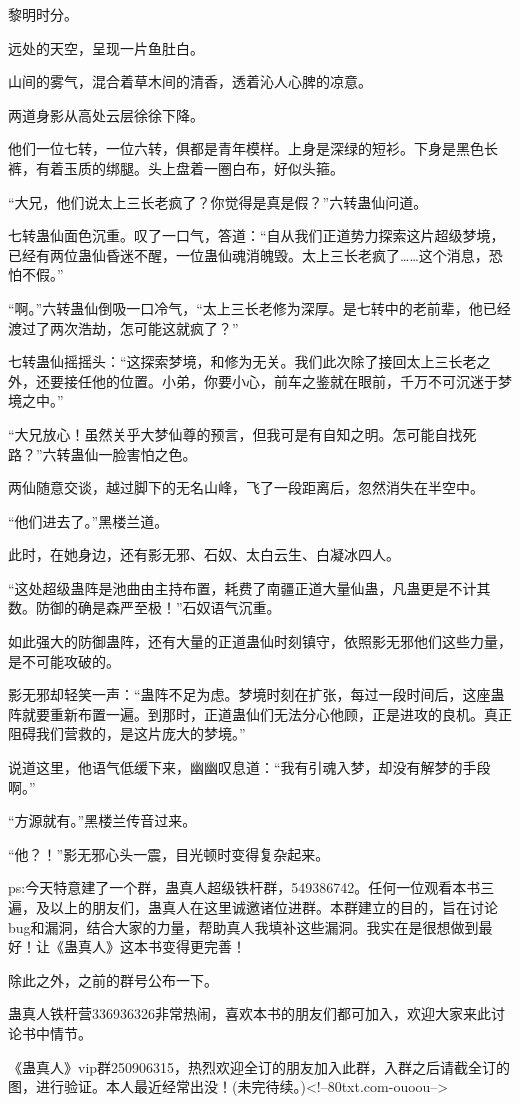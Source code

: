 \begin{this_body}
黎明时分。

远处的天空，呈现一片鱼肚白。

山间的雾气，混合着草木间的清香，透着沁人心脾的凉意。

两道身影从高处云层徐徐下降。

他们一位七转，一位六转，俱都是青年模样。上身是深绿的短衫。下身是黑色长裤，有着玉质的绑腿。头上盘着一圈白布，好似头箍。

“大兄，他们说太上三长老疯了？你觉得是真是假？”六转蛊仙问道。

七转蛊仙面色沉重。叹了一口气，答道：“自从我们正道势力探索这片超级梦境，已经有两位蛊仙昏迷不醒，一位蛊仙魂消魄毁。太上三长老疯了……这个消息，恐怕不假。”

“啊。”六转蛊仙倒吸一口冷气，“太上三长老修为深厚。是七转中的老前辈，他已经渡过了两次浩劫，怎可能这就疯了？”

七转蛊仙摇摇头：“这探索梦境，和修为无关。我们此次除了接回太上三长老之外，还要接任他的位置。小弟，你要小心，前车之鉴就在眼前，千万不可沉迷于梦境之中。”

“大兄放心！虽然关乎大梦仙尊的预言，但我可是有自知之明。怎可能自找死路？”六转蛊仙一脸害怕之色。

两仙随意交谈，越过脚下的无名山峰，飞了一段距离后，忽然消失在半空中。

“他们进去了。”黑楼兰道。

此时，在她身边，还有影无邪、石奴、太白云生、白凝冰四人。

“这处超级蛊阵是池曲由主持布置，耗费了南疆正道大量仙蛊，凡蛊更是不计其数。防御的确是森严至极！”石奴语气沉重。

如此强大的防御蛊阵，还有大量的正道蛊仙时刻镇守，依照影无邪他们这些力量，是不可能攻破的。

影无邪却轻笑一声：“蛊阵不足为虑。梦境时刻在扩张，每过一段时间后，这座蛊阵就要重新布置一遍。到那时，正道蛊仙们无法分心他顾，正是进攻的良机。真正阻碍我们营救的，是这片庞大的梦境。”

说道这里，他语气低缓下来，幽幽叹息道：“我有引魂入梦，却没有解梦的手段啊。”

“方源就有。”黑楼兰传音过来。

“他？！”影无邪心头一震，目光顿时变得复杂起来。

ps:今天特意建了一个群，蛊真人超级铁杆群，549386742。任何一位观看本书三遍，及以上的朋友们，蛊真人在这里诚邀诸位进群。本群建立的目的，旨在讨论bug和漏洞，结合大家的力量，帮助真人我填补这些漏洞。我实在是很想做到最好！让《蛊真人》这本书变得更完善！

除此之外，之前的群号公布一下。

蛊真人铁杆营336936326非常热闹，喜欢本书的朋友们都可加入，欢迎大家来此讨论书中情节。

《蛊真人》vip群250906315，热烈欢迎全订的朋友加入此群，入群之后请截全订的图，进行验证。本人最近经常出没！(未完待续。)<!--80txt.com-ouoou-->

\end{this_body}

